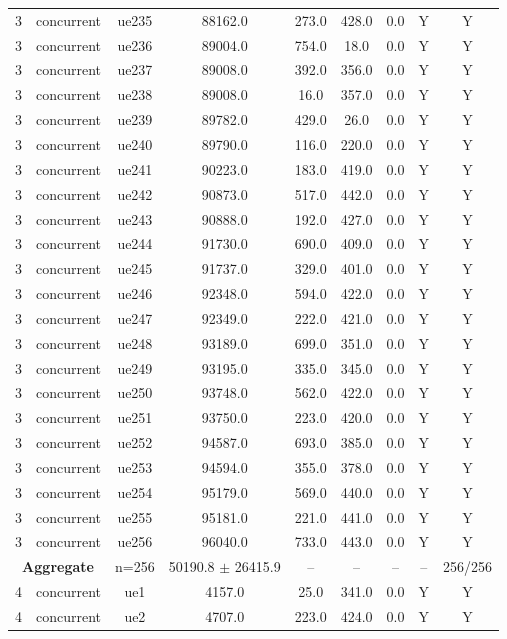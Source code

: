 \begin{table}[ht]
\begin{tabular}{|c|c|c|c|c|c|c|c|c|}
3 & concurrent & ue235 & 88162.0 & 273.0 & 428.0 & 0.0 & Y & Y \\
3 & concurrent & ue236 & 89004.0 & 754.0 & 18.0 & 0.0 & Y & Y \\
3 & concurrent & ue237 & 89008.0 & 392.0 & 356.0 & 0.0 & Y & Y \\
3 & concurrent & ue238 & 89008.0 & 16.0 & 357.0 & 0.0 & Y & Y \\
3 & concurrent & ue239 & 89782.0 & 429.0 & 26.0 & 0.0 & Y & Y \\
3 & concurrent & ue240 & 89790.0 & 116.0 & 220.0 & 0.0 & Y & Y \\
3 & concurrent & ue241 & 90223.0 & 183.0 & 419.0 & 0.0 & Y & Y \\
3 & concurrent & ue242 & 90873.0 & 517.0 & 442.0 & 0.0 & Y & Y \\
3 & concurrent & ue243 & 90888.0 & 192.0 & 427.0 & 0.0 & Y & Y \\
3 & concurrent & ue244 & 91730.0 & 690.0 & 409.0 & 0.0 & Y & Y \\
3 & concurrent & ue245 & 91737.0 & 329.0 & 401.0 & 0.0 & Y & Y \\
3 & concurrent & ue246 & 92348.0 & 594.0 & 422.0 & 0.0 & Y & Y \\
3 & concurrent & ue247 & 92349.0 & 222.0 & 421.0 & 0.0 & Y & Y \\
3 & concurrent & ue248 & 93189.0 & 699.0 & 351.0 & 0.0 & Y & Y \\
3 & concurrent & ue249 & 93195.0 & 335.0 & 345.0 & 0.0 & Y & Y \\
3 & concurrent & ue250 & 93748.0 & 562.0 & 422.0 & 0.0 & Y & Y \\
3 & concurrent & ue251 & 93750.0 & 223.0 & 420.0 & 0.0 & Y & Y \\
3 & concurrent & ue252 & 94587.0 & 693.0 & 385.0 & 0.0 & Y & Y \\
3 & concurrent & ue253 & 94594.0 & 355.0 & 378.0 & 0.0 & Y & Y \\
3 & concurrent & ue254 & 95179.0 & 569.0 & 440.0 & 0.0 & Y & Y \\
3 & concurrent & ue255 & 95181.0 & 221.0 & 441.0 & 0.0 & Y & Y \\
3 & concurrent & ue256 & 96040.0 & 733.0 & 443.0 & 0.0 & Y & Y \\
\multicolumn{2}{|c|}{\textbf{Aggregate}} & n=256 & 50190.8 $\pm$ 26415.9 & -- & -- & -- & -- & 256/256 \\
\hline
4 & concurrent & ue1 & 4157.0 & 25.0 & 341.0 & 0.0 & Y & Y \\
4 & concurrent & ue2 & 4707.0 & 223.0 & 424.0 & 0.0 & Y & Y \\

\end{tabular}
\end{table}
